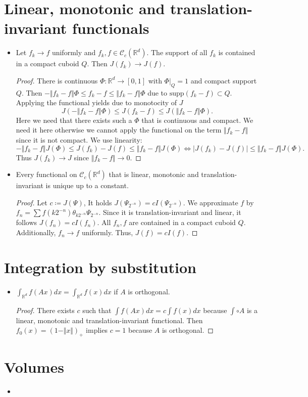 \documentclass[a4paper, 11pt]{article}
\theoremstyle{plain}
\theoremstyle{definition}
\begin{document}
\section{Linear, monotonic and translation-invariant functionals} 
\begin{itemize}
	\item Let $f_k \to f$ uniformly and $f_k,f \in \mathcal C_c(\mathbb R^d)$. The support of all $f_k$ is contained in a compact cuboid $Q$. Then $J(f_k) \to J(f)$.
	
	\begin{proof}
		There is continuous $\Phi: \mathbb R^d \to [0,1]$ with $\Phi|_{Q} = 1$ and compact support $Q$. Then $-\Vert f_k - f\Vert \Phi \leq  f_k - f \leq \Vert f_k - f\Vert \Phi$ due to $\mathrm{supp}(f_k - f) \subset Q$. Applying the functional yields due to monotocity of $J$
		\[
			J(-\Vert f_k - f\Vert \Phi) \leq J(f_k - f)\leq J(\Vert f_k - f\Vert \Phi).
		\] 
		Here we need that there exists such a $\Phi$ that is continuous and compact. We need it here otherwise we cannot apply the functional on the term $\Vert f_k - f\Vert $ since it is not compact. We use linearity:
		\[
					-\Vert f_k - f\Vert J(\Phi) \leq J(f_k) - J(f)\leq \Vert f_k - f\Vert J(\Phi) \iff |J(f_k) - J(f)| \leq  \Vert f_k - f\Vert J(\Phi).
		\]
		Thus $J(f_k) \to J$ since $ \Vert f_k - f\Vert \to 0$.
	\end{proof}

	\item Every functional on $\mathcal C_c(\mathbb R^d)$ that is linear, monotonic and translation-invariant is unique up to a constant.
	
	\begin{proof}
		Let $c \coloneqq J(\Psi)$, It holds $J(\Psi_{2^{-n}}) = c I(\Psi_{2^{-n}})$. We approximate $f$ by $f_n = \sum f(k2^{-n})\theta_{k2^{-n}}\Psi_{2^{-n}}$. Since it is translation-invariant and linear, it follows $J(f_n) = cI(f_n)$. All $f_n, f$ are contained in a compact cuboid $Q$. Additionally, $f_n \to f$ uniformly. Thus, $J(f) = cI(f)$.
	\end{proof}
\end{itemize}

\section{Integration by substitution}
\begin{itemize}
	\item $\int_{\mathbb R^d} f(Ax) dx = \int_{\mathbb R^d} f(x)dx$ if $A$ is orthogonal.
	
	\begin{proof}
		There exists $c$ such that $\int f(Ax)dx = c \int f(x)dx$ because $\int \circ A$ is a linear, monotonic and translation-invariant functional. Then $f_0(x) = (1-\Vert x \Vert )_+$ implies $c = 1$ because $A$ is orthogonal.
	\end{proof}
\end{itemize}

\section{Volumes} 
\begin{itemize}
	\item 
\end{itemize}
\end{document}
